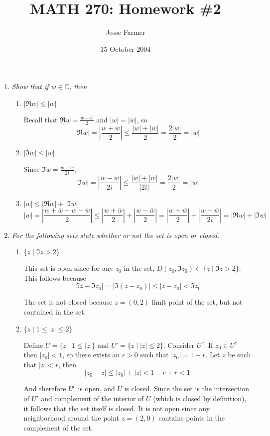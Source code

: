 \documentclass[letterpaper, 11pt]{article}
\title{MATH 270: Homework \#2}
\author{Jesse Farmer}
\date{15 October 2004}
\begin{document}
\maketitle
\begin{enumerate}

\item \emph{Show that if $w \in \mathbb{C}$, then}
\begin{enumerate}
\item \emph{$|\Re w| \leq |w|$}

Recall that $\Re w = \frac{w + \overline{w}}{2}$ and $|w| = |\overline{w}|$, so
\[
|\Re w| = \left| \frac{w + \overline{w}}{2}\right| \leq \frac{|w| + |\overline{w}|}{2} = \frac{2|w|}{2} = |w|
\]
\item \emph{$|\Im w| \leq |w|$}

Since $\Im w = \frac{w - \overline{w}}{2i}$, 
\[
|\Im w| = \left| \frac{w - \overline{w}}{2i}\right| \leq \frac{|w| + |\overline{w}|}{|2i|} = \frac{2|w|}{2} = |w|
\]
\item \emph{$|w| \leq |\Re w| + |\Im w|$}
\[
|w| = \left|\frac{w + \overline{w} + w - \overline{w}}{2}\right| \leq \left| \frac{w + \overline{w}}{2} \right| + \left| \frac{w - \overline{w}}{2} \right| = \left| \frac{w + \overline{w}}{2} \right| + \left| \frac{w - \overline{w}}{2i} \right| = |\Re w| + |\Im w|
\]
\end{enumerate}

\item \emph{For the following sets state whether or not the set is open or closed.}
\begin{enumerate}
\item \emph{$\{z \mid \Im z > 2\}$}

This set is open since for any $z_0$ in the set, $D(z_0, \Im z_0) \subset \{z \mid \Im z > 2\}$.  This follows because
\[
|\Im z - \Im z_0| = |\Im (z - z_0)| \leq |z - z_0| < \Im z_0
\]


The set is not closed because $z=(0,2)$ limit point of the set, but not contained in the set.

\item \emph{$\{z \mid 1 \leq |z| \leq 2\}$}

Define $U = \{z \mid 1 \leq |z| \}$ and $U' = \{z \mid |z| \leq 2\}$.  Consider $U^c$.  If $z_0 \in U^c$ then $|z_0| < 1$, so there exists an $r > 0$ such that $|z_0| = 1-r$.  Let $z$ be such that $|z| < r$, then
\[
|z_0 - z| \leq |z_0| + |z| < 1-r + r < 1
\]

And therefore $U^c$ is open, and $U$ is closed.  Since the set is the intersection of $U'$ and complement of the interior of $U$ (which is closed by definition), it follows that the set itself is closed.  It is not open since any neighborhood around the point $z=(2,0)$ contains points in the complement of the set.


\end{enumerate}
\end{enumerate}
\end{document}
